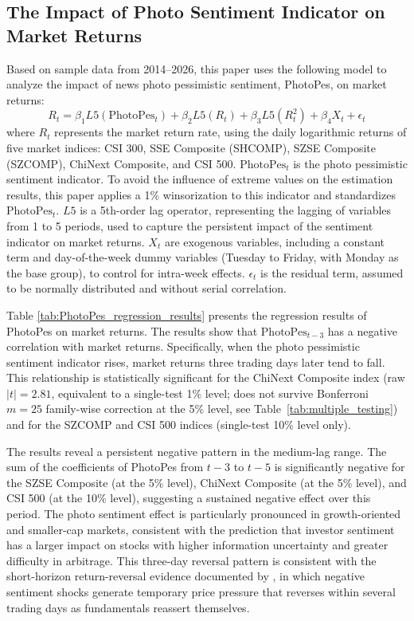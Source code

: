 \documentclass[AER]{AEA}
\begin{document}
\subsection{The Impact of Photo Sentiment Indicator on Market Returns}
\label{sec:photopes_marginal}
Based on sample data from 2014--2026, this paper uses the following model to analyze the impact of news photo pessimistic sentiment, PhotoPes, on market returns:
\begin{equation}
R_t = \beta_1 L5(\text{PhotoPes}_t) + \beta_2 L5(R_t) + \beta_3 L5(R_t^2) + \beta_4 X_t + \epsilon_t
\end{equation}
where $R_t$ represents the market return rate, using the daily logarithmic returns of five market indices: CSI 300, SSE Composite (SHCOMP), SZSE Composite (SZCOMP), ChiNext Composite, and CSI 500. $\text{PhotoPes}_t$ is the photo pessimistic sentiment indicator. To avoid the influence of extreme values on the estimation results, this paper applies a 1\% winsorization to this indicator and standardizes $\text{PhotoPes}_t$. $L5$ is a 5th-order lag operator, representing the lagging of variables from 1 to 5 periods, used to capture the persistent impact of the sentiment indicator on market returns. $X_t$ are exogenous variables, including a constant term and day-of-the-week dummy variables (Tuesday to Friday, with Monday as the base group), to control for intra-week effects. $\epsilon_t$ is the residual term, assumed to be normally distributed and without serial correlation.

Table \ref{tab:PhotoPes_regression_results} presents the regression results of PhotoPes on market returns. The results show that $\text{PhotoPes}_{t-3}$ has a negative correlation with market returns. Specifically, when the photo pessimistic sentiment indicator rises, market returns three trading days later tend to fall. This relationship is statistically significant for the ChiNext Composite index (raw $|t|=2.81$, equivalent to a single-test 1\% level; does not survive Bonferroni $m=25$ family-wise correction at the 5\% level, see Table~\ref{tab:multiple_testing}) and for the SZCOMP and CSI 500 indices (single-test 10\% level only).

The results reveal a persistent negative pattern in the medium-lag range. The sum of the coefficients of PhotoPes from $t-3$ to $t-5$ is significantly negative for the SZSE Composite (at the 5\% level), ChiNext Composite (at the 5\% level), and CSI 500 (at the 10\% level), suggesting a sustained negative effect over this period. The photo sentiment effect is particularly pronounced in growth-oriented and smaller-cap markets, consistent with the prediction that investor sentiment has a larger impact on stocks with higher information uncertainty and greater difficulty in arbitrage. This three-day reversal pattern is consistent with the short-horizon return-reversal evidence documented by \citet{jegadeesh1990evidence}, in which negative sentiment shocks generate temporary price pressure that reverses within several trading days as fundamentals reassert themselves.
\end{document}
